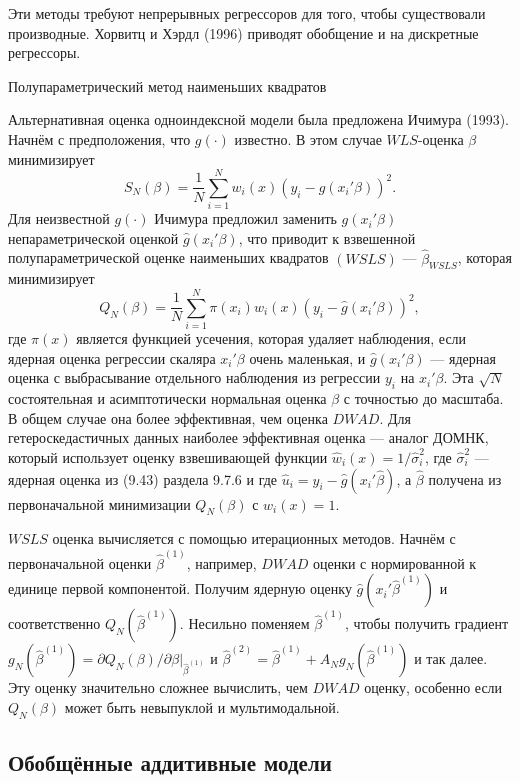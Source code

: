 Эти методы требуют непрерывных регрессоров для того, чтобы существовали производные. Хорвитц и Хэрдл (1996) приводят обобщение и на дискретные регрессоры.

\begin{center}
Полупараметрический метод наименьших квадратов
\end{center}

Альтернативная оценка одноиндексной модели была предложена Ичимура (1993). Начнём с предположения, что $g(\cdot)$ известно. В этом случае $WLS$-оценка $\beta$ минимизирует
\[
S_N(\beta) = \frac{1}{N} \sum_{i=1}^N w_i(x)(y_i - g(x_i'\beta))^2.
\]
Для неизвестной $g(\cdot)$ Ичимура предложил заменить $g(x_i'\beta)$ непараметрической оценкой $\hat{g}(x_i'\beta)$, что приводит к взвешенной полупараметрической оценке наименьших квадратов $(WSLS)$ --- $\hat{\beta}_{WSLS}$, которая минимизирует
\[
Q_N(\beta) = \frac{1}{N} \sum_{i=1}^N \pi(x_i)w_i(x)(y_i - \hat{g}(x_i'\beta))^2,
\]
где $\pi(x)$ является функцией усечения, которая удаляет наблюдения, если ядерная оценка регрессии скаляра $x_i'\beta$ очень маленькая, и $\hat{g}(x_i'\beta)$ ---  ядерная оценка с выбрасывание отдельного наблюдения из регрессии $y_i$ на $x_i'\beta$. Эта $\sqrt{N}$ состоятельная и асимптотически нормальная оценка $\beta$ с точностью до масштаба. В общем случае она более эффективная, чем оценка $DWAD$. Для гетероскедастичных данных наиболее эффективная оценка --- аналог ДОМНК, который использует оценку взвешивающей функции $\hat{w}_i(x) = 1/\hat{\sigma}_i^2$, где $\hat{\sigma}_i^2$ --- ядерная оценка из (9.43) раздела 9.7.6 и где $\hat{u}_i = y_i - \hat{g}(x_i'\hat{\beta})$, а $\hat{\beta}$ получена из первоначальной минимизации $Q_N(\beta)$ с $w_i(x) = 1$.

$WSLS$ оценка вычисляется с помощью итерационных методов. Начнём с первоначальной оценки $\hat{\beta}^{(1)}$, например, $DWAD$ оценки с нормированной к единице первой компонентой. Получим ядерную оценку $\hat{g}(x_i'\hat{\beta}^{(1)})$ и соответственно $Q_N(\hat{\beta}^{(1)})$. Несильно поменяем $\hat{\beta}^{(1)}$, чтобы получить градиент $g_N(\hat{\beta}^{(1)}) = \partial{Q_N(\beta)}/\partial{\beta}|_{\hat{\beta}^{(1)}}$ и $\hat{\beta}^{(2)} = \hat{\beta}^{(1)} + A_Ng_N(\hat{\beta}^{(1)})$ и так далее. Эту оценку значительно сложнее вычислить, чем $DWAD$ оценку, особенно если $Q_N(\beta)$ может быть невыпуклой и мультимодальной.
 
\subsection{Обобщённые аддитивные модели}

